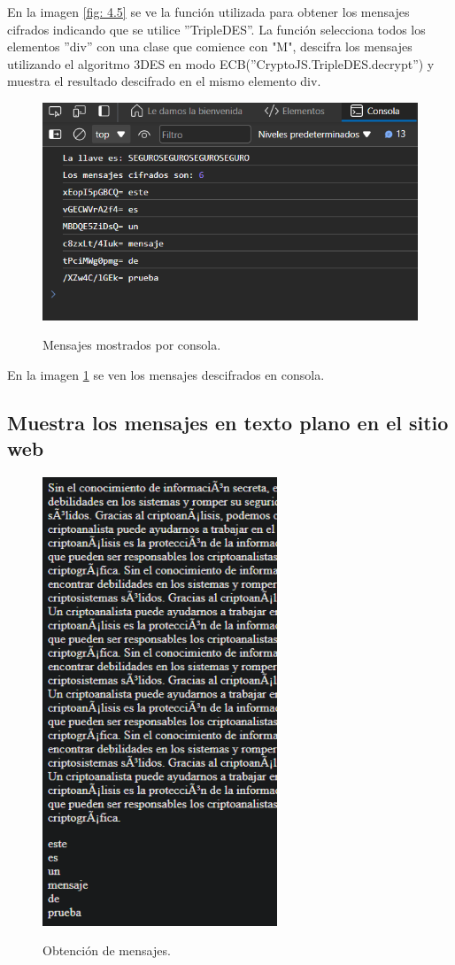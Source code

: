 \documentclass[letter,12pt]{article}
\begin{document}
En la imagen \ref{fig: 4.5} se ve la función utilizada para obtener los mensajes cifrados indicando que se utilice ''TripleDES''. La función selecciona todos los elementos ''div'' con una clase que comience con "M", descifra los mensajes utilizando el algoritmo 3DES en modo ECB(''CryptoJS.TripleDES.decrypt'')  y muestra el resultado descifrado en el mismo elemento div.

      \begin{figure}[H]
        \centering
        \includegraphics[width=15cm]{img/parte 3/4.5(consola).png}
        \label{fig: 4.6.2}
        \caption{Mensajes mostrados por consola.}
    \end{figure}

En la imagen \ref{fig: 4.6.2} se ven los mensajes descifrados en consola.

\subsection{Muestra los mensajes en texto plano en el sitio web}

  \begin{figure}[H]
        \centering
        \includegraphics[width=7cm]{img/parte 3/4.6.png}
        \label{fig: 4.6}
        \caption{Obtención de mensajes.}
    \end{figure}
\end{document}
